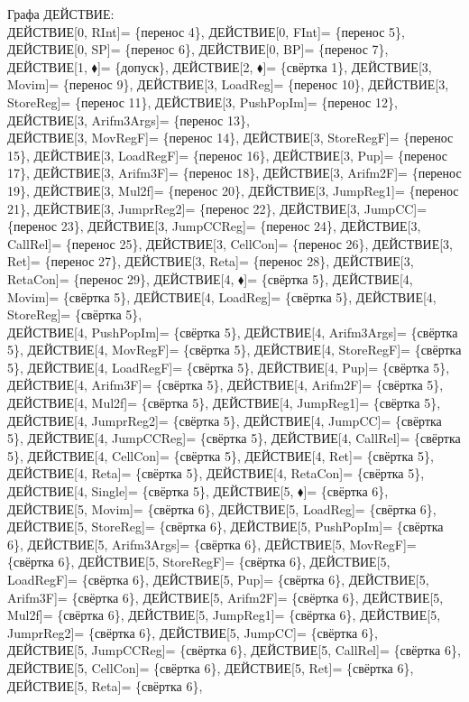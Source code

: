 \documentclass[a0]{a0poster}
\begin{document}
\tiny 
Графа ДЕЙСТВИЕ:\\
ДЕЙСТВИЕ[0, RInt]= \{перенос 4\}, ДЕЙСТВИЕ[0, FInt]= \{перенос 5\}, ДЕЙСТВИЕ[0, SP]= \{перенос 6\}, ДЕЙСТВИЕ[0, BP]= \{перенос 7\}, ДЕЙСТВИЕ[1, $\blacklozenge$]= \{допуск\}, ДЕЙСТВИЕ[2, $\blacklozenge$]= \{свёртка 1\}, ДЕЙСТВИЕ[3, Movim]= \{перенос 9\}, ДЕЙСТВИЕ[3, LoadReg]= \{перенос 10\}, ДЕЙСТВИЕ[3, StoreReg]= \{перенос 11\}, ДЕЙСТВИЕ[3, PushPopIm]= \{перенос 12\}, ДЕЙСТВИЕ[3, Arifm3Args]= \{перенос 13\}, \\
ДЕЙСТВИЕ[3, MovRegF]= \{перенос 14\}, ДЕЙСТВИЕ[3, StoreRegF]= \{перенос 15\}, ДЕЙСТВИЕ[3, LoadRegF]= \{перенос 16\}, ДЕЙСТВИЕ[3, Pup]= \{перенос 17\}, ДЕЙСТВИЕ[3, Arifm3F]= \{перенос 18\}, ДЕЙСТВИЕ[3, Arifm2F]= \{перенос 19\}, ДЕЙСТВИЕ[3, Mul2f]= \{перенос 20\}, ДЕЙСТВИЕ[3, JumpReg1]= \{перенос 21\}, ДЕЙСТВИЕ[3, JumprReg2]= \{перенос 22\}, ДЕЙСТВИЕ[3, JumpCC]= \{перенос 23\}, ДЕЙСТВИЕ[3, JumpCCReg]= \{перенос 24\}, ДЕЙСТВИЕ[3, CallRel]= \{перенос 25\}, ДЕЙСТВИЕ[3, CellCon]= \{перенос 26\}, ДЕЙСТВИЕ[3, Ret]= \{перенос 27\}, ДЕЙСТВИЕ[3, Reta]= \{перенос 28\}, ДЕЙСТВИЕ[3, RetaCon]= \{перенос 29\}, ДЕЙСТВИЕ[4, $\blacklozenge$]= \{свёртка 5\}, ДЕЙСТВИЕ[4, Movim]= \{свёртка 5\}, ДЕЙСТВИЕ[4, LoadReg]= \{свёртка 5\}, ДЕЙСТВИЕ[4, StoreReg]= \{свёртка 5\}, \\
ДЕЙСТВИЕ[4, PushPopIm]= \{свёртка 5\}, ДЕЙСТВИЕ[4, Arifm3Args]= \{свёртка 5\}, ДЕЙСТВИЕ[4, MovRegF]= \{свёртка 5\}, ДЕЙСТВИЕ[4, StoreRegF]= \{свёртка 5\}, ДЕЙСТВИЕ[4, LoadRegF]= \{свёртка 5\}, ДЕЙСТВИЕ[4, Pup]= \{свёртка 5\}, ДЕЙСТВИЕ[4, Arifm3F]= \{свёртка 5\}, ДЕЙСТВИЕ[4, Arifm2F]= \{свёртка 5\}, ДЕЙСТВИЕ[4, Mul2f]= \{свёртка 5\}, ДЕЙСТВИЕ[4, JumpReg1]= \{свёртка 5\}, ДЕЙСТВИЕ[4, JumprReg2]= \{свёртка 5\}, ДЕЙСТВИЕ[4, JumpCC]= \{свёртка 5\}, ДЕЙСТВИЕ[4, JumpCCReg]= \{свёртка 5\}, ДЕЙСТВИЕ[4, CallRel]= \{свёртка 5\}, ДЕЙСТВИЕ[4, CellCon]= \{свёртка 5\}, ДЕЙСТВИЕ[4, Ret]= \{свёртка 5\}, ДЕЙСТВИЕ[4, Reta]= \{свёртка 5\}, ДЕЙСТВИЕ[4, RetaCon]= \{свёртка 5\}, ДЕЙСТВИЕ[4, Single]= \{свёртка 5\}, ДЕЙСТВИЕ[5, $\blacklozenge$]= \{свёртка 6\}, \\
ДЕЙСТВИЕ[5, Movim]= \{свёртка 6\}, ДЕЙСТВИЕ[5, LoadReg]= \{свёртка 6\}, ДЕЙСТВИЕ[5, StoreReg]= \{свёртка 6\}, ДЕЙСТВИЕ[5, PushPopIm]= \{свёртка 6\}, ДЕЙСТВИЕ[5, Arifm3Args]= \{свёртка 6\}, ДЕЙСТВИЕ[5, MovRegF]= \{свёртка 6\}, ДЕЙСТВИЕ[5, StoreRegF]= \{свёртка 6\}, ДЕЙСТВИЕ[5, LoadRegF]= \{свёртка 6\}, ДЕЙСТВИЕ[5, Pup]= \{свёртка 6\}, ДЕЙСТВИЕ[5, Arifm3F]= \{свёртка 6\}, ДЕЙСТВИЕ[5, Arifm2F]= \{свёртка 6\}, ДЕЙСТВИЕ[5, Mul2f]= \{свёртка 6\}, ДЕЙСТВИЕ[5, JumpReg1]= \{свёртка 6\}, ДЕЙСТВИЕ[5, JumprReg2]= \{свёртка 6\}, ДЕЙСТВИЕ[5, JumpCC]= \{свёртка 6\}, ДЕЙСТВИЕ[5, JumpCCReg]= \{свёртка 6\}, ДЕЙСТВИЕ[5, CallRel]= \{свёртка 6\}, ДЕЙСТВИЕ[5, CellCon]= \{свёртка 6\}, ДЕЙСТВИЕ[5, Ret]= \{свёртка 6\}, ДЕЙСТВИЕ[5, Reta]= \{свёртка 6\}, \\
\end{document}
